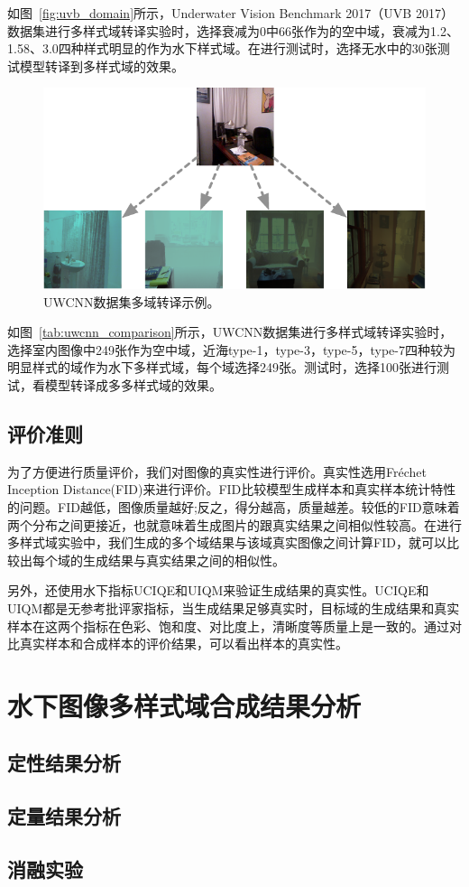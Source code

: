 如图~\ref{fig:uvb_domain}所示，Underwater Vision Benchmark 2017（UVB 2017）数据集进行多样式域转译实验时，选择衰减为0中66张作为的空中域，衰减为1.2、1.58、3.0四种样式明显的作为水下样式域。在进行测试时，选择无水中的30张测试模型转译到多样式域的效果。

\begin{figure}[ht]
    \centering
  \includegraphics[width=\textwidth]{figures/UWCNN_dataset_domain.pdf}
  \caption{UWCNN数据集多域转译示例。}
  \label{fig:uwcnn_domain}
\end{figure}

如图~\ref{tab:uwcnn_comparison}所示，UWCNN数据集进行多样式域转译实验时，选择室内图像中249张作为空中域，近海type-1，type-3，type-5，type-7四种较为明显样式的域作为水下多样式域，每个域选择249张。测试时，选择100张进行测试，看模型转译成多多样式域的效果。

\subsection{评价准则}
为了方便进行质量评价，我们对图像的真实性进行评价。真实性选用Fréchet Inception Distance(FID)来进行评价。FID比较模型生成样本和真实样本统计特性的问题。FID越低，图像质量越好;反之，得分越高，质量越差。较低的FID意味着两个分布之间更接近，也就意味着生成图片的跟真实结果之间相似性较高。在进行多样式域实验中，我们生成的多个域结果与该域真实图像之间计算FID，就可以比较出每个域的生成结果与真实结果之间的相似性。

另外，还使用水下指标UCIQE和UIQM来验证生成结果的真实性。UCIQE和UIQM都是无参考批评家指标，当生成结果足够真实时，目标域的生成结果和真实样本在这两个指标在色彩、饱和度、对比度上，清晰度等质量上是一致的。通过对比真实样本和合成样本的评价结果，可以看出样本的真实性。


\section{水下图像多样式域合成结果分析}
\subsection{定性结果分析}

\subsection{定量结果分析}


\subsection{消融实验}
